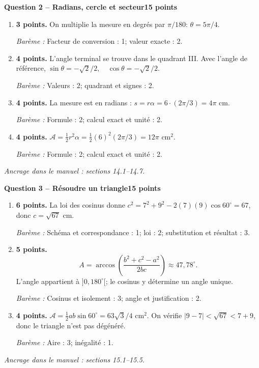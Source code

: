 \documentclass[11pt,a4paper]{article}
\begin{document}
\newpage
{\large\bfseries Question 2 -- Radians, cercle et secteur}\hfill\textbf{15 points}\par
\begin{enumerate}
\item \textbf{3 points.} On multiplie la mesure en degrés par \(\pi/180\): \(\theta=5\pi/4\).
\par{\small\textit{Barème : }Facteur de conversion : 1; valeur exacte : 2.}
\item \textbf{4 points.} L’angle terminal se trouve dans le quadrant III. Avec l’angle de référence, \(\sin\theta=-\sqrt2/2,\quad\cos\theta=-\sqrt2/2\).
\par{\small\textit{Barème : }Valeurs : 2; quadrant et signes : 2.}
\item \textbf{4 points.} La mesure est en radians : \(s=r\alpha=6\cdot(2\pi/3)=4\pi\) cm.
\par{\small\textit{Barème : }Formule : 2; calcul exact et unité : 2.}
\item \textbf{4 points.} \(\mathcal A=\frac12r^2\alpha=\frac12(6)^2(2\pi/3)=12\pi\) cm\(^2\).
\par{\small\textit{Barème : }Formule : 2; calcul exact et unité : 2.}
\end{enumerate}
\vfill {\small\textit{Ancrage dans le manuel : sections 14.1--14.7.}}

\newpage
{\large\bfseries Question 3 -- Résoudre un triangle}\hfill\textbf{15 points}\par
\begin{enumerate}
\item \textbf{6 points.} La loi des cosinus donne \(c^2=7^2+9^2-2(7)(9)\cos60^\circ=67\), donc \(c=\sqrt{67}\) cm.
\par{\small\textit{Barème : }Schéma et correspondance : 1; loi : 2; substitution et résultat : 3.}
\item \textbf{5 points.} \[A=\arccos\!\left(\frac{b^2+c^2-a^2}{2bc}\right)\approx 47{,}78^\circ.\] L’angle appartient à \(]0,180^\circ[\); le cosinus y détermine un angle unique.
\par{\small\textit{Barème : }Cosinus et isolement : 3; angle et justification : 2.}
\item \textbf{4 points.} \(\mathcal A=\frac12 ab\sin60^\circ=63\sqrt3/4\) cm\(^2\). On vérifie \(|9-7|<\sqrt{67}<7+9\), donc le triangle n’est pas dégénéré.
\par{\small\textit{Barème : }Aire : 3; inégalité : 1.}
\end{enumerate}
\vfill {\small\textit{Ancrage dans le manuel : sections 15.1--15.5.}}
\end{document}
